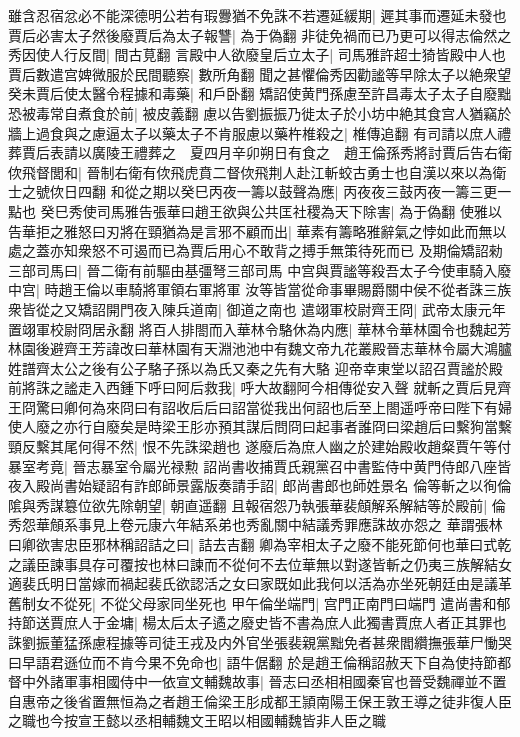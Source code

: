雖含忍宿忿必不能深德明公若有瑕釁猶不免誅不若遷延緩期|{
	遲其事而遷延未發也}
賈后必害太子然後廢賈后為太子報讐|{
	為于偽翻}
非徒免禍而已乃更可以得志倫然之秀因使人行反間|{
	間古莧翻}
言殿中人欲廢皇后立太子|{
	司馬雅許超士猗皆殿中人也}
賈后數遣宫婢微服於民間聽察|{
	數所角翻}
聞之甚懼倫秀因勸謐等早除太子以絶衆望癸未賈后使太醫令程據和毒藥|{
	和戶卧翻}
矯詔使黄門孫慮至許昌毒太子太子自廢黜恐被毒常自煮食於前|{
	被皮義翻}
慮以告劉振振乃徙太子於小坊中絶其食宫人猶竊於牆上過食與之慮逼太子以藥太子不肯服慮以藥杵椎殺之|{
	椎傳追翻}
有司請以庶人禮葬賈后表請以廣陵王禮葬之　夏四月辛卯朔日有食之　趙王倫孫秀將討賈后告右衛佽飛督閭和|{
	晉制右衛有佽飛虎賁二督佽飛荆人赴江斬蛟古勇士也自漢以來以為衛士之號佽日四翻}
和從之期以癸巳丙夜一籌以鼓聲為應|{
	丙夜夜三鼓丙夜一籌三更一點也}
癸巳秀使司馬雅告張華曰趙王欲與公共匡社稷為天下除害|{
	為于偽翻}
使雅以告華拒之雅怒曰刃將在頸猶為是言邪不顧而出|{
	華素有籌略雅辭氣之悖如此而無以處之蓋亦知衆怒不可遏而已為賈后用心不敢背之搏手無策待死而已}
及期倫矯詔勑三部司馬曰|{
	晉二衛有前驅由基彊弩三部司馬}
中宫與賈謐等殺吾太子今使車騎入廢中宫|{
	時趙王倫以車騎將軍領右軍將軍}
汝等皆當從命事畢賜爵關中侯不從者誅三族衆皆從之又矯詔開門夜入陳兵道南|{
	御道之南也}
遣翊軍校尉齊王冏|{
	武帝太康元年置翊軍校尉冏居永翻}
將百人排閤而入華林令駱休為内應|{
	華林令華林園令也魏起芳林園後避齊王芳諱改曰華林園有天淵池池中有魏文帝九花叢殿晉志華林令屬大鴻臚姓譜齊太公之後有公子駱子孫以為氏又秦之先有大駱}
迎帝幸東堂以詔召賈謐於殿前將誅之謐走入西鍾下呼曰阿后救我|{
	呼大故翻阿今相傳從安入聲}
就斬之賈后見齊王冏驚曰卿何為來冏曰有詔收后后曰詔當從我出何詔也后至上閤遥呼帝曰陛下有婦使人廢之亦行自廢矣是時梁王肜亦預其謀后問冏曰起事者誰冏曰梁趙后曰繫狗當繫頸反繫其尾何得不然|{
	恨不先誅梁趙也}
遂廢后為庶人幽之於建始殿收趙粲賈午等付暴室考竟|{
	晉志暴室令屬光禄勲}
詔尚書收捕賈氏親黨召中書監侍中黄門侍郎八座皆夜入殿尚書始疑詔有詐郎師景露版奏請手詔|{
	郎尚書郎也師姓景名}
倫等斬之以徇倫隂與秀謀簒位欲先除朝望|{
	朝直遥翻}
且報宿怨乃執張華裴頠解系解結等於殿前|{
	倫秀怨華頠系事見上卷元康六年結系弟也秀亂關中結議秀罪應誅故亦怨之}
華謂張林曰卿欲害忠臣邪林稱詔詰之曰|{
	詰去吉翻}
卿為宰相太子之廢不能死節何也華曰式乾之議臣諫事具存可覆按也林曰諫而不從何不去位華無以對遂皆斬之仍夷三族解結女適裴氏明日當嫁而禍起裴氏欲認活之女曰家既如此我何以活為亦坐死朝廷由是議革舊制女不從死|{
	不從父母家同坐死也}
甲午倫坐端門|{
	宫門正南門曰端門}
遣尚書和郁持節送賈庶人于金墉|{
	楊太后太子遹之廢史皆不書為庶人此獨書賈庶人者正其罪也}
誅劉振董猛孫慮程據等司徒王戎及内外官坐張裴親黨黜免者甚衆閻纘撫張華尸慟哭曰早語君遜位而不肯今果不免命也|{
	語牛倨翻}
於是趙王倫稱詔赦天下自為使持節都督中外諸軍事相國侍中一依宣文輔魏故事|{
	晉志曰丞相相國秦官也晉受魏禪並不置自惠帝之後省置無恒為之者趙王倫梁王肜成都王頴南陽王保王敦王導之徒非復人臣之職也今按宣王懿以丞相輔魏文王昭以相國輔魏皆非人臣之職}
